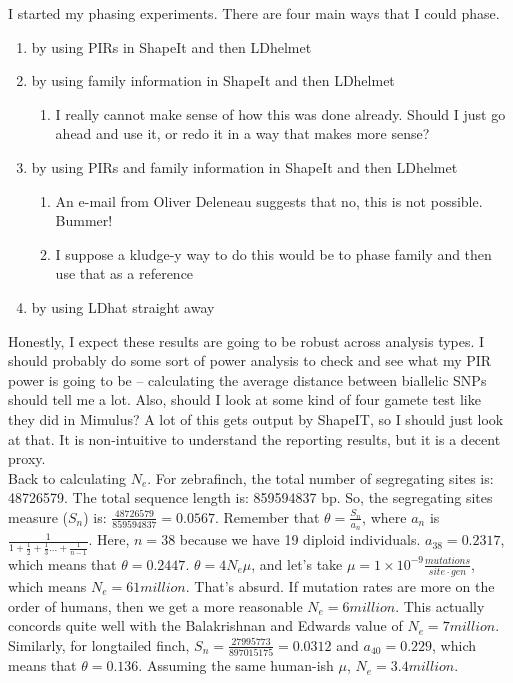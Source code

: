 \documentclass[idxtotoc,hyperref,openany,oneside]{labbook} %
\begin{document}
I started my phasing experiments. There are four main ways that I could phase. 
\begin{enumerate}
\item by using PIRs in ShapeIt and then LDhelmet
\item by using family information in ShapeIt and then LDhelmet
	\begin{enumerate}
	\item I really cannot make sense of how this was done already. Should I just go ahead and use it, or redo it in a way that makes more sense?
	\end{enumerate}
\item by using PIRs and family information in ShapeIt and then LDhelmet 
	\begin{enumerate}
	\item An e-mail from Oliver Deleneau suggests that no, this is not possible. Bummer!
	\item I suppose a kludge-y way to do this would be to phase family and then use that as a reference
	\end{enumerate}
\item by using LDhat straight away
\end{enumerate}
Honestly, I expect these results are going to be robust across analysis types. I should probably do some sort of power analysis to check and see what my PIR power is going to be -- calculating the average distance between biallelic SNPs should tell me a lot. Also, should I look at some kind of four gamete test like they did in Mimulus? A lot of this gets output by ShapeIT, so I should just look at that. It is non-intuitive to understand the reporting results, but it is a decent proxy. \\

Back to calculating $N_e$. For zebrafinch, the total number of segregating sites is: 48726579. The total sequence length is: 859594837 bp. So, the segregating sites measure ($S_n$) is: $\frac{48726579}{859594837} = 0.0567$. Remember that $\theta = \frac{S_n}{a_n}$, where $a_n$ is $\frac{1}{1+\frac{1}{2}+\frac{1}{3} ... + \frac{1}{n - 1}}$. Here, $n=38$ because we have 19 diploid individuals. $a_{38} = 0.2317$, which means that $\theta = 0.2447$. $\theta = 4N_e\mu$, and let's take $\mu = 1 \times 10^{-9} \frac{mutations}{site \cdot gen}$, which means $N_e = 61 million$. That's absurd. If mutation rates are more on the order of humans, then we get a more reasonable $N_e = 6 million$. This actually concords quite well with the Balakrishnan and Edwards value of $N_e=7 million$. Similarly, for longtailed finch, $S_n = \frac{27995773}{897015175} = 0.0312$ and $a_{40} = 0.229$, which means that $\theta = 0.136$. Assuming the same human-ish $\mu$, $N_e = 3.4 million$. \\
\end{document}
